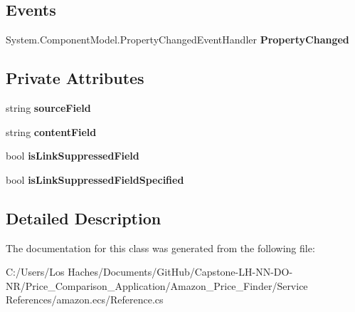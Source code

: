 \subsection*{Events}
\begin{DoxyCompactItemize}
\item 
\hypertarget{class_price___comparison_1_1amazon_1_1ecs_1_1_editorial_review_a0ab59c9923d4755fcd915e41413ab0b0}{System.\-Component\-Model.\-Property\-Changed\-Event\-Handler {\bfseries Property\-Changed}}\label{class_price___comparison_1_1amazon_1_1ecs_1_1_editorial_review_a0ab59c9923d4755fcd915e41413ab0b0}

\end{DoxyCompactItemize}
\subsection*{Private Attributes}
\begin{DoxyCompactItemize}
\item 
\hypertarget{class_price___comparison_1_1amazon_1_1ecs_1_1_editorial_review_a7929b2b9dd8f29b4f6ab04f1cfeef59f}{string {\bfseries source\-Field}}\label{class_price___comparison_1_1amazon_1_1ecs_1_1_editorial_review_a7929b2b9dd8f29b4f6ab04f1cfeef59f}

\item 
\hypertarget{class_price___comparison_1_1amazon_1_1ecs_1_1_editorial_review_a11465ed0fe4ac463f5b1b7f92377a5dc}{string {\bfseries content\-Field}}\label{class_price___comparison_1_1amazon_1_1ecs_1_1_editorial_review_a11465ed0fe4ac463f5b1b7f92377a5dc}

\item 
\hypertarget{class_price___comparison_1_1amazon_1_1ecs_1_1_editorial_review_adf7b22c945f151fbdae3e18d689fb9a8}{bool {\bfseries is\-Link\-Suppressed\-Field}}\label{class_price___comparison_1_1amazon_1_1ecs_1_1_editorial_review_adf7b22c945f151fbdae3e18d689fb9a8}

\item 
\hypertarget{class_price___comparison_1_1amazon_1_1ecs_1_1_editorial_review_ae29a24b21fafc4d9873759e1cabd845b}{bool {\bfseries is\-Link\-Suppressed\-Field\-Specified}}\label{class_price___comparison_1_1amazon_1_1ecs_1_1_editorial_review_ae29a24b21fafc4d9873759e1cabd845b}

\end{DoxyCompactItemize}


\subsection{Detailed Description}


The documentation for this class was generated from the following file\-:\begin{DoxyCompactItemize}
\item 
C\-:/\-Users/\-Los Haches/\-Documents/\-Git\-Hub/\-Capstone-\/\-L\-H-\/\-N\-N-\/\-D\-O-\/\-N\-R/\-Price\-\_\-\-Comparison\-\_\-\-Application/\-Amazon\-\_\-\-Price\-\_\-\-Finder/\-Service References/amazon.\-ecs/Reference.\-cs\end{DoxyCompactItemize}
